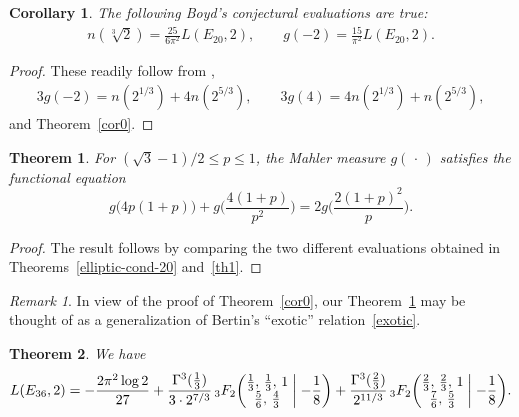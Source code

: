 \documentclass[12pt,reqno]{amsart}
\newtheorem{theorem}{Theorem}
\newtheorem*{corollary}{Corollary}
\theoremstyle{remark}
\newtheorem*{remark}{Remark}
\begin{document}
\begin{corollary}
\label{cor00}
The following Boyd's conjectural evaluations are true:
\begin{align*}
n(\sqrt[3]{2})=\frac{25}{6\pi^2}L(E_{20},2),
\qquad g(-2)=\frac{15}{\pi^2}L(E_{20},2).
\end{align*}
\end{corollary}

\begin{proof}
These readily follow from \cite[formula (2-26)]{LR},
\begin{align*}
3g(-2)=n(2^{1/3})+4n(2^{5/3}),
\qquad
3g(4)=4n(2^{1/3})+n(2^{5/3}),
\end{align*}
and Theorem~\ref{cor0}.
\end{proof}

\begin{theorem}
\label{cor1}
For $(\sqrt3-1)/2\le p\le 1$, the Mahler measure $g(\,\cdot\,)$ satisfies the functional equation
\begin{equation*}
g\bigl(4p(1+p)\bigr)+g\biggl(\frac{4(1+p)}{p^2}\biggr)=2g\biggl(\frac{2(1+p)^2}p\biggr).
\end{equation*}
\end{theorem}

\begin{proof}
The result follows by comparing the two different evaluations
obtained in Theorems~\ref{elliptic-cond-20} and~\ref{th1}.
\end{proof}

\begin{remark}
In view of the proof of Theorem~\ref{cor0}, our
Theorem~\ref{cor1} may be thought of as a generalization
of Bertin's ``exotic'' relation~\eqref{exotic}.
\end{remark}

\begin{theorem}
\label{cor2}
We have
\begin{equation*}
L(E_{36},2)
=-\frac{2\pi^2\log2}{27}+\frac{\Gamma^3(\tfrac13)}{3\cdot2^{7/3}}
\,{}_3F_2\biggl(\begin{matrix} \frac13, \, \frac13, \, 1 \\
\frac56, \, \frac43 \end{matrix}\biggm| -\frac18 \biggr)
+\frac{\Gamma^3(\tfrac23)}{2^{11/3}}
\,{}_3F_2\biggl(\begin{matrix} \frac23, \, \frac23, \, 1 \\
\frac76, \, \frac53 \end{matrix}\biggm| -\frac18 \biggr).
\end{equation*}
\end{theorem}
\end{document}
